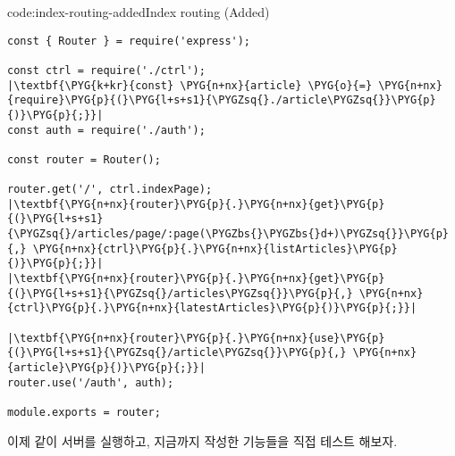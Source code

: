 \begin{code}{code:index-routing-added}{Index routing (Added)}
\begin{verbatim}
const { Router } = require('express');

const ctrl = require('./ctrl');
|\textbf{\PYG{k+kr}{const} \PYG{n+nx}{article} \PYG{o}{=} \PYG{n+nx}{require}\PYG{p}{(}\PYG{l+s+s1}{\PYGZsq{}./article\PYGZsq{}}\PYG{p}{)}\PYG{p}{;}}|
const auth = require('./auth');

const router = Router();

router.get('/', ctrl.indexPage);
|\textbf{\PYG{n+nx}{router}\PYG{p}{.}\PYG{n+nx}{get}\PYG{p}{(}\PYG{l+s+s1}{\PYGZsq{}/articles/page/:page(\PYGZbs{}\PYGZbs{}d+)\PYGZsq{}}\PYG{p}{,} \PYG{n+nx}{ctrl}\PYG{p}{.}\PYG{n+nx}{listArticles}\PYG{p}{)}\PYG{p}{;}}|
|\textbf{\PYG{n+nx}{router}\PYG{p}{.}\PYG{n+nx}{get}\PYG{p}{(}\PYG{l+s+s1}{\PYGZsq{}/articles\PYGZsq{}}\PYG{p}{,} \PYG{n+nx}{ctrl}\PYG{p}{.}\PYG{n+nx}{latestArticles}\PYG{p}{)}\PYG{p}{;}}|

|\textbf{\PYG{n+nx}{router}\PYG{p}{.}\PYG{n+nx}{use}\PYG{p}{(}\PYG{l+s+s1}{\PYGZsq{}/article\PYGZsq{}}\PYG{p}{,} \PYG{n+nx}{article}\PYG{p}{)}\PYG{p}{;}}|
router.use('/auth', auth);

module.exports = router;
\end{verbatim}
\end{code}







이제 \와 같이 서버를 실행하고, 지금까지 작성한 기능들을 직접 테스트 해보자.
